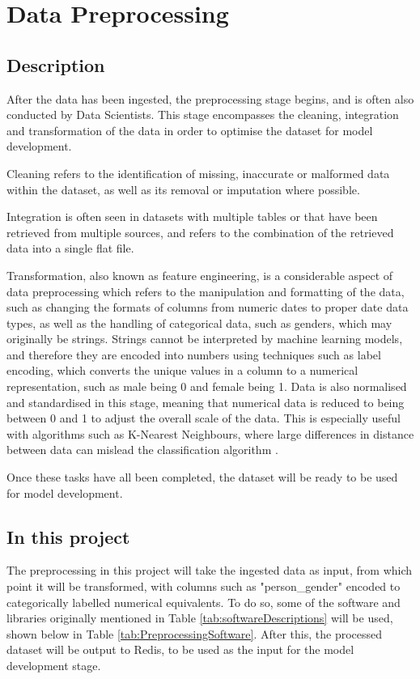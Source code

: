 \documentclass[12pt]{report}
\begin{document}
\pagebreak %

\section{Data Preprocessing}\label{sec:Preprocessing}
\subsection{Description}
After the data has been ingested, the preprocessing stage begins, and is often also conducted by 
Data Scientists. This stage encompasses the
cleaning, integration and transformation of the data in order to optimise the dataset for model development.

Cleaning refers to the identification of missing, inaccurate or malformed data within the dataset,
as well as its removal or imputation where possible.

Integration is often seen in datasets with multiple tables or that have been retrieved from multiple sources,
and refers to the combination of the retrieved data into a single flat file. 

Transformation, also known as feature engineering, is a considerable aspect of data preprocessing
which refers to the manipulation and formatting of the data, such as changing the formats of columns 
from numeric dates to proper date data types, as well as the handling of categorical data, such as genders, 
which may originally be strings. Strings cannot be interpreted by machine learning models, and therefore they 
are encoded into numbers using techniques such as label encoding, which converts the unique values in a column
to a numerical representation, such as male being 0 and female being 1. Data is also normalised and standardised 
in this stage, meaning that numerical data is reduced to being between 0 and 1 to adjust the overall scale of the 
data. This is especially useful with algorithms such as K-Nearest Neighbours, where large differences in distance 
between data can mislead the classification algorithm \autocite{ibm_what_2021}.

Once these tasks have all been completed, the dataset will be ready to be used for model development.

\subsection{In this project}
The preprocessing in this project will take the ingested data as input, from which point it will be transformed,
with columns such as "person\_gender" encoded to categorically labelled numerical equivalents. To do so, some of the software
and libraries originally mentioned in Table \ref{tab:softwareDescriptions} will be used, shown below in Table \ref{tab:PreprocessingSoftware}.
After this, the processed dataset will be output to Redis, to be used as the input for the model development stage.
\end{document}
